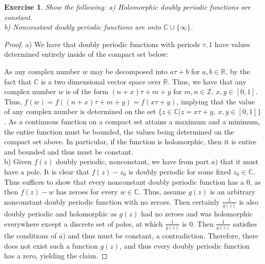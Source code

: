 \documentclass{article}
\newcommand{\bb}[1]{\mathbb{#1}}
\newtheorem{exercise}{Exercise}
\begin{document}
  \begin{exercise}
    Show the following:
    a) Holomorphic doubly periodic functions are constant. \\
    b) Nonconstant doubly periodic functions are onto $\bb{C} \cup \{\infty\}$.
  \end{exercise}
  \begin{proof}
    a) We have that doubly periodic functions with periods $\tau, 1$ have values determined entirely inside of the compact set below:
    \begin{center}

    \end{center}
    As any complex number $w$ may be decomposed into $a\tau + b$ for $a, b \in \bb{R}$, by the fact that $\bb{C}$ is a two dimensional vector space over $\bb{R}$. Thus, we have that any complex number $w$ is of the form $(n + x)\tau + m + y$ for $m,n \in \bb{Z}$, $x, y \in [0,1]$. Thus, $f(w) = f((n + x)\tau + m + y) = f(x\tau + y)$, implying that the value of any complex number is determined on the set $\{z \in \bb{C} | z = x\tau + y, \ x,y \in [0,1] \}$. As a continuous function on a compact set attains a maximum and a minimum, the entire function must be bounded, the values being determined on the compact set above. In particular, if the function is holomorphic, then it is entire and bounded and thus must be constant. \\
    b) Given $f(z)$ doubly periodic, nonconstant, we have from part $a)$ that it must have a pole. It is clear that $f(z) - z_{0}$ is doubly periodic for some fixed $z_{0} \in \bb{C}$. Thus suffices to show that every nonconstant doubly periodic function has a $0$, as then $f(z) - w$ has zeroes for every $w \in \bb{C}$. Thus, assume $g(z)$ is an arbitrary nonconstant doubly periodic function with no zeroes. Then certainly $\frac{1}{g(z)}$ is also doubly periodic and holomorphic as $g(z)$ had no zeroes and was holomorphic everywhere except a discrete set of poles, at which $\frac{1}{g(z)}$ is 0. Then $\frac{1}{g(z)}$ satisfies the conditions of $a)$ and thus must be constant, a contradiction. Therefore, there does not exist such a function $g(z)$, and thus every doubly periodic function has a zero, yielding the claim. 
  \end{proof}
\end{document}
